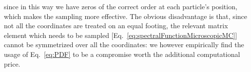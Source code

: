 \documentclass[twocolumn,pra,superscriptaddress,noshowpacs]{revtex4}
\begin{document}
since in this way we have zeros of the correct order at each particle's position, which makes the sampling more effective. 
The obvious disadvantage is that, since not all the coordinates are treated on an equal footing, the relevant matrix element which needs to be sampled [Eq.~\eqref{eq:spectralFunctionMicroscopicMC}]
cannot be symmetrized over all the coordinates: we however empirically find the usage of Eq.~\eqref{eq:PDF} to be a compromise worth the additional computational price.


    
\end{document}
